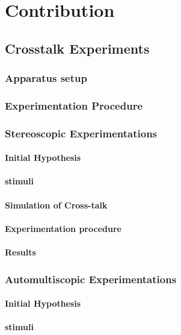 \chapter{Contribution}
\label{chap:contribution}

\section{Crosstalk Experiments}

\subsection{Apparatus setup}
\subsection{Experimentation Procedure}

\subsection{Stereoscopic Experimentations}
\subsubsection{Initial Hypothesis}
\subsubsection{stimuli}
\subsubsection{Simulation of Cross-talk}
\subsubsection{Experimentation procedure}
\subsubsection{Results}

\subsection{Automultiscopic Experimentations}
\subsubsection{Initial Hypothesis}
\subsubsection{stimuli}
